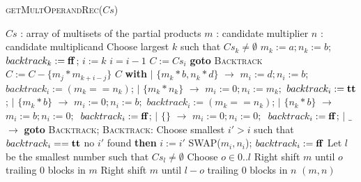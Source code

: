 \begin{algorithm}[t]
 \caption{\textsc{getMultOperandRec}($Cs$)}
 \label{alg:hb}
 \begin{algorithmic}[1]
   \Ensure $Cs$ : array of multisets of the partial products
   \State $m$ : candidate multiplier 
   \State $n$ : candidate multiplicand
   \State Choose largest $k$ such that $Cs_k\neq \emptyset$
   \State $m_k := a; n_k := b$; $backtrack_k := \mathbf{ff}$; 
   \Else
   \State {}
   \EndIf
   \State $i := k$
   \State $i = i - 1 $
   \State $C := Cs_i$
    {\bf goto }{\textsc{Backtrack}}
   \State $C := C - \{m_j*m_{k+i-j}\}$
   \EndIf
   \EndFor
    $C$ {\bf with}
   \State\quad $\mid$ $\{m_k*b,n_k*d\}$ $\rightarrow$ $m_i := d; n_i := b$;
   $backtrack_i := (m_k == n_k)$; 
   \State\quad $\mid$ $\{m_k*n_k\}$ $\rightarrow$ $m_i := 0; n_i := m_k;$
   $backtrack_i := \mathbf{tt}$; 
   \State \quad$\mid$ $\{m_k*b\}$ $\rightarrow$ $m_i := 0; n_i := b;$
   $backtrack_i := (m_k == n_k)$; 
   \State \quad $\mid$ $\{n_k*b\}$ $\rightarrow$ $m_i := b; n_i := 0;$\
   $backtrack_i := \mathbf{ff}$; 
   \State \quad $\mid$ $\{\}$ $\rightarrow$ $m_i := 0; n_i := 0;$\
   $backtrack_i := \mathbf{ff}$; 
   \State \quad $\mid$ $\_$ $\rightarrow$ {\bf goto }{\textsc{Backtrack}};
   \State {\bf continue;}
   \State \textsc{Backtrack:}
   \State \quad Choose smallest $i' > i$ such that $backtrack_i == \mathbf{tt}$
   \State \quad {\bf if} no $i'$ found {\bf then} 
   \State \quad $i := i'$
   \State \quad \textsc{SWAP}($m_i,n_i$); $backtrack_{i} := \mathbf{ff}$
   \EndWhile
   \State Let $l$ be the smallest number such that $Cs_l\neq \emptyset$
   \State Choose $o \in 0..l$
   \State Right shift $m$ until $o$ trailing $0$ blocks in $m$
   \State Right shift $m$ until $l-o$ trailing $0$ blocks in $n$
   \State \Return $(m,n)$
 \end{algorithmic}
\end{algorithm}  


